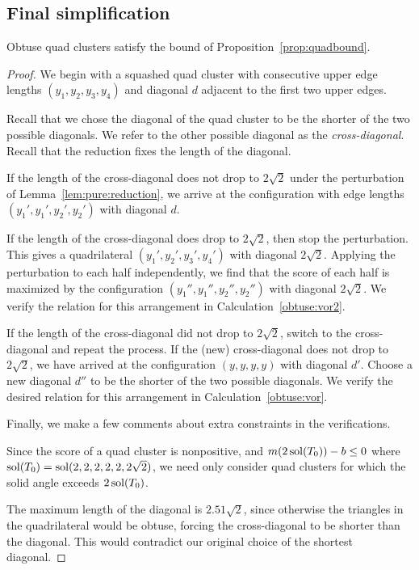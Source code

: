 \subsection{Final simplification}
\begin{lem}
\label{lem:pure:obtuse}
Obtuse quad clusters satisfy the bound of Proposition~\ref{prop:quadbound}.
\end{lem}
\begin{proof}
We begin with a squashed quad cluster with consecutive upper
edge lengths $(y_1,y_2,y_3,y_4)$ and diagonal $d$ adjacent to
the first two upper edges.

Recall that we chose the diagonal of the quad cluster to be the
shorter of the two possible diagonals.  We refer to the other
possible diagonal as the {\em cross-diagonal}.
Recall that the reduction fixes the length of the diagonal.

If the length of the cross-diagonal does not drop to $2\sqrt{2}$
under the perturbation of Lemma~\ref{lem:pure:reduction}, we arrive at the configuration with
edge lengths $(y_1', y_1', y_2', y_2')$ with diagonal $d$.

If the length of the cross-diagonal does drop to $2\sqrt{2}$, then
stop the perturbation.  This gives a quadrilateral
$(y_1', y_2', y_3', y_4')$ with diagonal $2\sqrt{2}$.
Applying the perturbation to each half independently, we find
that the score of each half is maximized by the configuration
$(y_1'', y_1'', y_2'', y_2'')$ with diagonal $2\sqrt{2}$.
We verify the relation for this arrangement in
Calculation~\ref{obtuse:vor2}.

If the length of the cross-diagonal did not drop to $2\sqrt{2}$,
switch to the cross-diagonal and repeat the process.  If the
(new) cross-diagonal does not drop to $2\sqrt{2}$, we have
arrived at the configuration $(y,y,y,y)$ with diagonal $d'$.
Choose a new diagonal $d''$ to be the shorter of the two
possible diagonals.  We verify the desired relation for
this arrangement in Calculation~\ref{obtuse:vor}.

Finally, we make a few comments about extra constraints in
the verifications.

Since the score of a quad cluster is nonpositive, and $m
(2\operatorname{sol}(T_0)) - b \le 0$ where $\operatorname{sol}(T_0) = \operatorname{sol}( 2,2,2,2,2,2\sqrt{2}
)$, we need only consider quad clusters for which the solid angle
exceeds $2\operatorname{sol}(T_0)$.

The maximum length of the diagonal is $2.51 \sqrt{2}$, since
otherwise the triangles in the quadrilateral would be obtuse,
forcing the cross-diagonal to be shorter than the diagonal.
This would contradict our
original choice of the shortest diagonal.


\end{proof}
